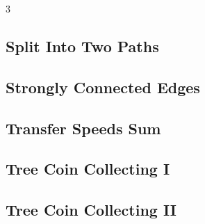 \documentclass[8pt]{extarticle}
\begin{document}
\begin{multicols*}{3}
\subsection{Split Into Two Paths}
\begin{caixaenunciado}

\end{caixaenunciado}
\vspace{0.3cm}


\subsection{Strongly Connected Edges}
\begin{caixaenunciado}

\end{caixaenunciado}
\vspace{0.3cm}


\subsection{Transfer Speeds Sum}
\begin{caixaenunciado}

\end{caixaenunciado}
\vspace{0.3cm}


\subsection{Tree Coin Collecting I}
\begin{caixaenunciado}

\end{caixaenunciado}
\vspace{0.3cm}


\subsection{Tree Coin Collecting II}
\begin{caixaenunciado}

\end{caixaenunciado}
\vspace{0.3cm}



\end{multicols*}
\end{document}
